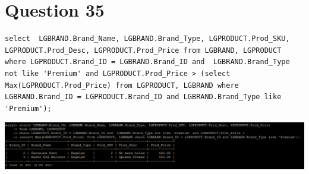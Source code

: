 \documentclass[a4paper,10pt]{article}
\begin{document}
\section*{Question 35}
\lstset{
            language=SQL,
            breaklines=true
            }
        \begin{lstlisting}[frame=single]
        select  LGBRAND.Brand_Name, LGBRAND.Brand_Type, LGPRODUCT.Prod_SKU, LGPRODUCT.Prod_Desc, LGPRODUCT.Prod_Price from LGBRAND, LGPRODUCT where LGPRODUCT.Brand_ID = LGBRAND.Brand_ID and  LGBRAND.Brand_Type not like 'Premium' and LGPRODUCT.Prod_Price > (select Max(LGPRODUCT.Prod_Price) from LGPRODUCT, LGBRAND where LGBRAND.Brand_ID = LGPRODUCT.Brand_ID and LGBRAND.Brand_Type like 'Premium');

        \end{lstlisting}
\includegraphics{Queries/Question_35/Question35.PNG}
\end{document}
